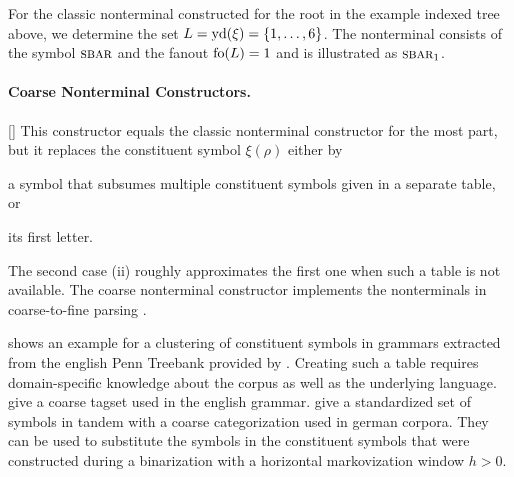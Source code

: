 \documentclass[../../document.tex]{subfiles}
\begin{document}
    For the classic nonterminal constructed for the root in the example indexed tree above, we determine the set \(L = \operatorname{yd}(\xi) = \{1,\ldots,6\}\).
    The nonterminal consists of the symbol \(\textsc{sbar}\) and the fanout \(\operatorname{fo}(L) = 1\) and is illustrated as \(\textsc{sbar}_1\).

    \paragraph{Coarse Nonterminal Constructors.}[]
    This constructor equals the classic nonterminal constructor for the most part, but it replaces the constituent symbol \(\xi(\rho)\) either by
    \begin{inparaenum}
        \item a symbol that subsumes multiple constituent symbols given in a separate table, or
        \item its first letter.
    \end{inparaenum}
    The second case (ii) roughly approximates the first one when such a table is not available.
    The coarse nonterminal constructor implements the nonterminals in coarse-to-fine parsing \cite{Cha06,??}.

     shows an example for a clustering of constituent symbols in grammars extracted from the english Penn Treebank provided by \citet{Cha06}.
    Creating such a table requires domain-specific knowledge about the corpus as well as the underlying language.
    \citet{DoHoSa70} give a coarse tagset used in the english  grammar.
    \citet{SchiTeuSt99} give a standardized set of  symbols in tandem with a coarse categorization used in german corpora.
    They can be used to substitute the  symbols in the constituent symbols that were constructed during a binarization with a horizontal markovization window \(h>0\).
\end{document}
